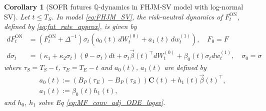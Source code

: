 \documentclass[pdftex,11pt,a4paper] {article}
\newtheorem{corollary}{Corollary}[section]
\begin{document}
\begin{corollary}[SOFR futures $\mathbb{Q}$-dynamics in FHJM-SV model with log-normal SV]\label{thm:futures_dynamics_Q}
Let $t\le T_S$. In model \eqref{eq:FHJM_SV}, the risk-neutral dynamics of $ F^{\mathrm{ON}}_t$,  defined by \eqref{eq:fut_rate_approx}, is given by 
\begin{equation}\label{eq:futures_Q}
\begin{split}
d F^{\mathrm{ON}}_t&=\left( F^{\mathrm{ON}}_t+\Delta^{-1}\right)\sigma_t\left(a_0(t)\,dW_t^{(0)}+a_1(t)\,dw_t^{(1)}\right), \quad  F_0=F\\
d\sigma_t&=\left(\kappa_{1}+\kappa_{2}\sigma_t\right)(\theta-\sigma_t)dt + \sigma_t\vec{\beta}(t)^\top dW^{(0)}_t+\beta_0(t)\sigma_tdw^{(1)}_t,\quad \sigma_0=\sigma
\end{split}
\end{equation}
where $\tau_S=T_S-t$, $\tau_E=T_E-t$ and $a_0(t)$, $a_1(t)$ are defined by
\begin{equation}\label{eq:futures_coeffs_a}
\begin{split}
&a_0(t):=(B_P(\tau_E)-B_P(\tau_S))\mathbf{C}(t)+h_1(t)\vec{\beta}(t)^\top,\\
&a_1(t):=\beta_0(t)h_1(t),
\end{split}
\end{equation}
and $h_0$, $h_1$ solve Eq \eqref{eq:MF_conv_adj_ODE_logsv}.
\end{corollary}
\end{document}
